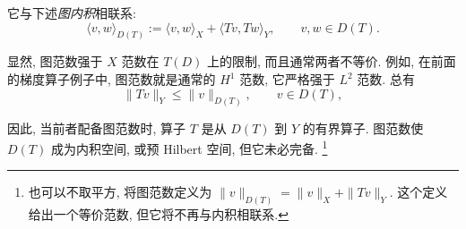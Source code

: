 它与下述\emph{图内积}相联系:
\[
\langle v,w\rangle_{D(T)}:=\langle v,w\rangle_X+\langle Tv,Tw\rangle_Y,\qquad v,w\in D(T).
\]

显然, 图范数强于 $X$ 范数在 $T(D)$ 上的限制, 而且通常两者不等价. 例如, 在前面的梯度算子例子中, 图范数就是通常的 $H^1$ 范数, 它严格强于 $L^2$ 范数. 总有
\[
\|Tv\|_Y\leq\|v\|_{D(T)},\qquad v\in D(T),
\]

因此, 当前者配备图范数时, 算子 $T$ 是从 $D(T)$ 到 $Y$ 的有界算子. 图范数使 $D(T)$ 成为内积空间, 或预 Hilbert 空间, 但它未必完备.%
\footnote{{也可以不取平方, 将图范数定义为 $\|v\|_{D(T)}=\|v\|_X+\|Tv\|_Y$. 这个定义给出一个等价范数, 但它将不再与内积相联系.}}
